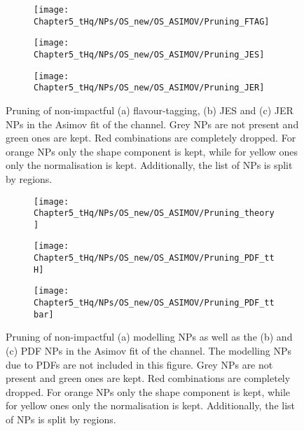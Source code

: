 \begin{figure}[h]
\begin{subfigure}{0.45\textwidth}
  \centering
  \texttt{[image: Chapter5\_tHq/NPs/OS\_new/OS\_ASIMOV/Pruning\_FTAG]}
  \caption{}
\end{subfigure}
\hfill 
\begin{subfigure}{0.45\textwidth}
  \texttt{[image: Chapter5\_tHq/NPs/OS\_new/OS\_ASIMOV/Pruning\_JES]}
  \caption{}
  \texttt{[image: Chapter5\_tHq/NPs/OS\_new/OS\_ASIMOV/Pruning\_JER]}
  \caption{}
\end{subfigure}
   \caption{Pruning of non-impactful (a) flavour-tagging, (b) JES and (c) JER NPs in the Asimov fit of the \dilepOStau channel.  Grey NPs are 
   not present and green ones are kept. Red combinations are completely dropped. For orange NPs only the shape 
   component is kept, while for yellow ones only the normalisation is kept. Additionally, the list of NPs is split by regions.}
  \label{fig:Appendix:AdditionalResults:OS:Asimov:Pruning:instrumental_FTAG}
\end{figure}


\begin{figure}[h]
  \centering
  \begin{subfigure}{0.45\textwidth}
      	\texttt{[image: Chapter5\_tHq/NPs/OS\_new/OS\_ASIMOV/Pruning\_theory]}
	\caption{}
  \end{subfigure}
  \hfill
  \begin{subfigure}{0.45\textwidth}
 	\texttt{[image: Chapter5\_tHq/NPs/OS\_new/OS\_ASIMOV/Pruning\_PDF\_ttH]}
	\caption{}
  	\texttt{[image: Chapter5\_tHq/NPs/OS\_new/OS\_ASIMOV/Pruning\_PDF\_ttbar]}  
	\caption{}
  \end{subfigure}
   \caption{Pruning of non-impactful (a) modelling NPs as well as the (b) \ttH and (c) \ttbar PDF NPs in the Asimov fit of the \dilepOStau channel. 
   The modelling NPs due to PDFs are not included in this figure. Grey NPs are 
   not present and green ones are kept. Red combinations are completely dropped. For orange NPs only the shape 
   component is kept, while for yellow ones only the normalisation is kept. Additionally, the list of NPs is split by regions.}
  \label{fig:Appendix:AdditionalResults:OS:Asimov:Pruning:Theory}
\end{figure}

